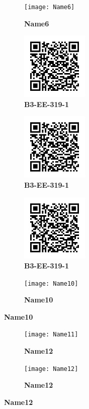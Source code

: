 \documentclass{article}
\begin{document}
	\begin{figure}[]
		\centering
		\begin{subfigure}{0.19\textwidth}
			\centering
			\texttt{[image: Name6]}
			\caption*{\large{\textbf{Name6}}}
		\end{subfigure}\hfil
		\begin{subfigure}{0.19\textwidth}
			\centering
			\includegraphics[width = 3.2cm,height = 3.2cm]{B3-EE-319-1}
			\caption*{\large{\textbf{B3-EE-319-1}}}
		\end{subfigure}\hfil
		\begin{subfigure}{0.19\textwidth}
			\centering
			\includegraphics[width = 3.2cm,height = 3.2cm]{B3-EE-319-1}
			\caption*{\large{\textbf{B3-EE-319-1}}}
		\end{subfigure}\hfil
		\begin{subfigure}{0.19\textwidth}
			\centering
			\includegraphics[width = 3.2cm,height = 3.2cm]{B3-EE-319-1}
			\caption*{\large{\textbf{B3-EE-319-1}}}
		\end{subfigure} \hfil
		\begin{subfigure}{0.19\textwidth}
			\centering
			\texttt{[image: Name10]}
			\caption*{\large{\textbf{Name10}}}
		\end{subfigure}\hfil
	\end{figure}
	
	
	\begin{figure}[]
		\centering
		\begin{subfigure}{0.19\textwidth}
			\centering
			\texttt{[image: Name11]}
			\caption*{\large{\textbf{Name12}}}
		\end{subfigure}\hfil
		\begin{subfigure}{0.19\textwidth}
			\centering
			\texttt{[image: Name12]}
			\caption*{\large{\textbf{Name12}}}
		\end{subfigure}\hfil 
	\end{figure}
	
	
\end{document}
